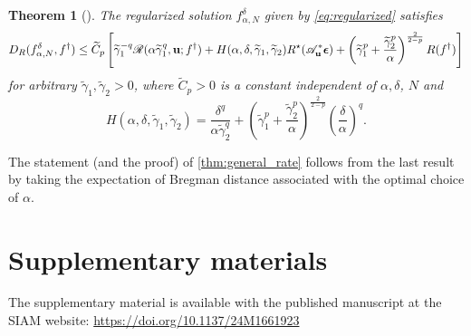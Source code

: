 \documentclass[11pt,a4paper]{article}
\numberwithin{equation}{section}
\newtheorem{theorem}{Theorem}[]
\newcommand{\msR}{\mathscr{R}}
\renewcommand{\vec}[1]{\boldsymbol{#1}} %
\newcommand{\bu}{{\bf u}}
\newcommand{\be}{{\vec{\epsilon}}}
\newcommand{\cAbu}{\mathscr{A}_{\bu}}
\def\fdan{f^\delta_{\alpha,N}}
\begin{document}
\begin{theorem}[{\cite[Theorem 4.3, (i)]{bubba2021}}]
\label{thm:bregman_dist_gen}
The regularized solution $\fdan$ given by \eqref{eq:regularized} satisfies
\begin{equation*}
	D_R(\fdan, f^\dag) 
	\leq   \widetilde C_p\left[\widetilde{\gamma}_1^{-q} \msR(\alpha \widetilde{\gamma}_1^q, \bu; f^\dag)  + 
	 H(\alpha, \delta, \widetilde{\gamma}_1, \widetilde{\gamma}_2) R^\star(\cAbu^* \be) +
	 \left(\widetilde{\gamma}_1^p	+ \frac{\widetilde{\gamma}_2^p}{\alpha}\right)^{\frac{2}{2-p}} R(f^\dag)\right]
\end{equation*}
for arbitrary $\widetilde{\gamma}_1,\widetilde{\gamma}_2 >0$, where $\widetilde C_p>0$ is a constant independent of $\alpha,\delta$, $N$ and 
\begin{equation*}
	H(\alpha, \delta, \widetilde{\gamma}_1, \widetilde{\gamma}_2) = \frac{\delta^q}{\alpha \widetilde{\gamma}_2^q} + \left(\widetilde{\gamma}_1^p	+ \frac{\widetilde{\gamma}_2^p}{\alpha}\right)^{\frac{2}{2-p}} \left(\frac \delta \alpha\right)^{q}.
\end{equation*}
\end{theorem}

The statement (and the proof) of \cref{thm:general_rate} follows from the last result by taking the expectation of Bregman distance associated with the optimal choice of $\alpha$. 

\section{Supplementary materials} \label{app:supplement}

The supplementary material is available with the published manuscript at the SIAM website: \url{https://doi.org/10.1137/24M1661923}




{\small%
}
\end{document}
